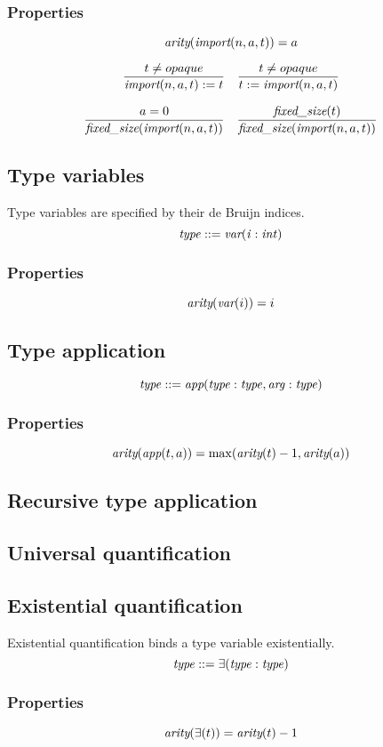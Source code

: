 \documentclass[a4paper]{report}
\newcommand\arity{{\ensuremath\textit{arity}}}
\newcommand\fixedsize{{\ensuremath\textit{fixed\_size}}}
\newcommand\tyImport{{\ensuremath\textit{import}}}
\newcommand\tyVar{{\ensuremath\textit{var}}}
\newcommand\tyApp{{\ensuremath\textit{app}}}
\begin{document}
\subsubsection*{Properties}
$$\arity(\tyImport(n, a, t)) = a$$

$$
{t \neq opaque
\over
\tyImport(n,a,t) := t}
\quad
{t \neq opaque
\over
t := \tyImport(n,a,t)}
$$

$$
{a=0 \over \fixedsize(\tyImport(n, a, t))}
\quad
{\fixedsize(t) \over \fixedsize(\tyImport(n, a, t))}
$$


\subsection{Type variables}
Type variables are specified by their de Bruijn indices.
$$
\it type ::= \tyVar(i : int)
$$

\subsubsection*{Properties}
$$\arity(\tyVar(i)) = i$$

\subsection{Type application}
$$
\it type ::= \tyApp(type : type, arg : type)
$$
\subsubsection*{Properties}
$$ \arity(\tyApp(t,a)) = \max(\arity(t)-1, \arity(a)) $$

\subsection{Recursive type application}
\subsection{Universal quantification}
\subsection{Existential quantification}
Existential quantification binds a type variable existentially.
$$ \it type ::= \exists(type : type) $$

\subsubsection*{Properties}
$$ \arity(\exists(t)) = \arity(t)-1 $$
\end{document}
